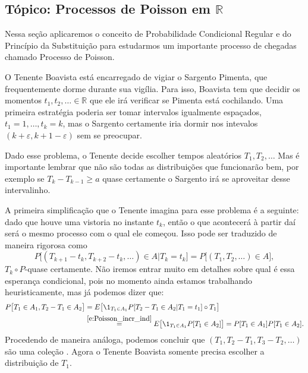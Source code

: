 \begin{topics}

\section{Tópico: Processos de Poisson em \texorpdfstring{$\mathbb{R}$}{R}}

Nessa seção aplicaremos o conceito de Probabilidade Condicional Regular e do Princípio da Substituição  para estudarmos um importante processo de chegadas chamado Processo de Poisson. 

O Tenente Boavista está encarregado de vigiar o Sargento Pimenta, que frequentemente dorme durante sua vigília.
Para isso, Boavista tem que decidir os momentos $t_1, t_2, \dots \in \mathbb{R}$ que ele irá verificar se Pimenta está cochilando.
Uma primeira estratégia poderia ser tomar intervalos igualmente espaçados, $t_1 = 1, \dots, t_k = k$, mas o Sargento certamente iria dormir nos intevalos $(k + \varepsilon, k + 1 - \varepsilon)$ sem se preocupar.

Dado esse problema, o Tenente decide escolher tempos aleatórios $T_1, T_2, \dots$
Mas é importante lembrar que não são todas as distribuições que funcionarão bem, por exemplo se $T_k - T_{k-1} \geq a$ quase certamente o Sargento irá se aproveitar desse intervalinho.

A primeira simplificação que o Tenente imagina para esse problema é a seguinte: dado que houve uma vistoria no instante $t_k$, então o que acontecerá à partir daí será o mesmo processo com o qual ele começou.
Isso pode ser traduzido de maneira rigorosa como
\begin{equation}
  \label{e:Poisson_incr_ind}
  P\big[ (T_{k+1} - t_k, T_{k+2} - t_k, \dots ) \in A | T_k = t_k \big] = P\big[ (T_1, T_2, \dots ) \in A \big],
\end{equation}
$T_k \circ P$-quase certamente.
Não iremos entrar muito em detalhes sobre qual é essa esperança condicional, pois no momento ainda estamos trabalhando heuristicamente, mas já podemos dizer que:
\begin{equation}
  \label{e:increm_poisson}
  \begin{split}
    P\big[ T_1 \in A_1, T_2 - T_1 \in A_2 \big] & = E\big[ \1_{T_1 \in A_1} P[T_2 - T_1 \in A_2 | T_1 = t_1] \circ T_1 \big]\\
    & \overset{\eqref{e:Poisson_incr_ind}}= E\big[ \1_{T_1 \in A_1} P[T_1 \in A_2] \big] = P[T_1 \in A_1] P[T_1 \in A_2].
  \end{split}
\end{equation}
Procedendo de maneira análoga, podemos concluir que $(T_1, T_2 - T_1, T_3 - T_2, \dots)$ são uma coleção \iid.
Agora o Tenente Boavista somente precisa escolher a distribuição de $T_1$.


\end{topics}
